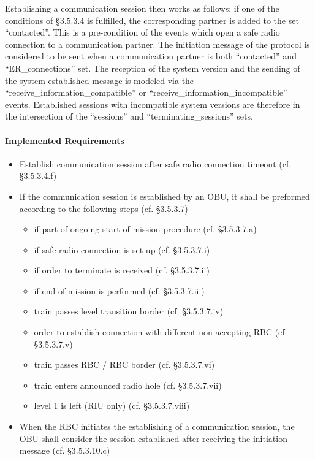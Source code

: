 \documentclass{template/openetcs_article}
\begin{document}
Establishing a communication session then works as follows: if one of the
conditions of §3.5.3.4 is fulfilled, the corresponding partner is added to the
set ``contacted''. This is a pre-condition of the events which open a safe radio
connection to a communication partner. The initiation message of the protocol is
considered to be sent when a communication partner is both ``contacted'' and
``ER\_connections'' set. The reception of the system version and the sending of
the system established message is modeled via the
``receive\_information\_compatible'' or ``receive\_information\_incompatible''
events. Established sessions with incompatible system versions are therefore in
the intersection of the ``sessions'' and ``terminating\_sessions'' sets.

\paragraph{Implemented Requirements}
\label{sec:impl-requ-4}

\begin{itemize}
\item Establish communication session after safe radio connection timeout
  (cf. §3.5.3.4.f)
\item If the communication session is established by an OBU, it shall be
  preformed according to the following steps (cf. §3.5.3.7)
  \begin{itemize}
  \item if part of ongoing start of mission procedure (cf. §3.5.3.7.a)
  \item if safe radio connection is set up (cf. §3.5.3.7.i)
  \item if order to terminate is received (cf. §3.5.3.7.ii)
  \item if end of mission is performed (cf. §3.5.3.7.iii)
  \item train passes level transition border (cf. §3.5.3.7.iv)
  \item order to establish connection with different non-accepting RBC
    (cf. §3.5.3.7.v)
  \item train passes RBC / RBC border (cf. §3.5.3.7.vi)
  \item train enters announced radio hole (cf. §3.5.3.7.vii)
  \item level 1 is left (RIU only) (cf. §3.5.3.7.viii)
  \end{itemize}
\item When the RBC initiates the establishing of a communication session, the
  OBU shall consider the session established after receiving the initiation
  message (cf. §3.5.3.10.c)
\end{itemize}


\end{document}
